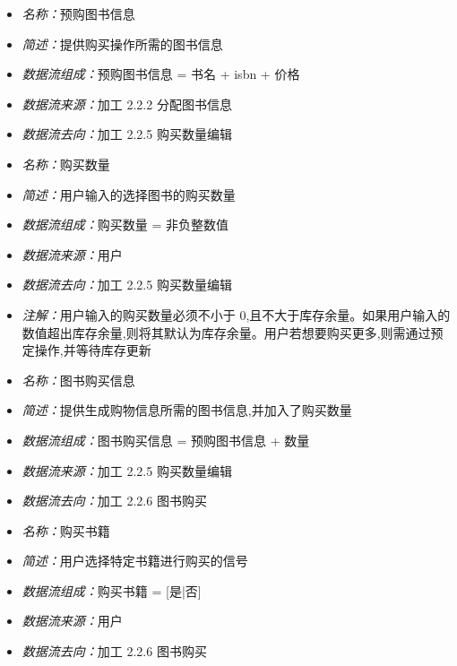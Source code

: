 \vspace{-1mm}

\begin{itemize}
\item \textit{名称：}预购图书信息
\item \textit{简述：}提供购买操作所需的图书信息
\item \textit{数据流组成：}预购图书信息  = 书名 + isbn + 价格
\item \textit{数据流来源：}加工 2.2.2 分配图书信息
\item \textit{数据流去向：}加工 2.2.5 购买数量编辑
\end{itemize}

\vspace{-1mm}

\begin{itemize}
	\item \textit{名称：}购买数量
	\item \textit{简述：}用户输入的选择图书的购买数量
	\item \textit{数据流组成：}购买数量 = 非负整数值
	\item \textit{数据流来源：}用户
	\item \textit{数据流去向：}加工 2.2.5 购买数量编辑
	\item \textit{注解：}用户输入的购买数量必须不小于 0,且不大于库存余量。如果用户输入的数值超出库存余量,则将其默认为库存余量。用户若想要购买更多,则需通过预定操作,并等待库存更新
\end{itemize}

\vspace{-1mm}

\begin{itemize}
	\item \textit{名称：}图书购买信息
	\item \textit{简述：}提供生成购物信息所需的图书信息,并加入了购买数量
	\item \textit{数据流组成：}图书购买信息  = 预购图书信息 + 数量
	\item \textit{数据流来源：}加工 2.2.5 购买数量编辑
	\item \textit{数据流去向：}加工 2.2.6 图书购买
\end{itemize}

\vspace{-1mm}

\begin{itemize}
	\item \textit{名称：}购买书籍
	\item \textit{简述：}用户选择特定书籍进行购买的信号
	\item \textit{数据流组成：}购买书籍 = [是|否]
	\item \textit{数据流来源：}用户
	\item \textit{数据流去向：}加工 2.2.6 图书购买
\end{itemize}

